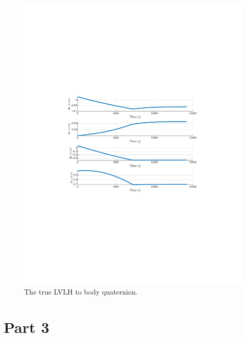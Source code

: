 \documentclass[]{article}
\begin{document}
\begin{figure}[!h]
	\centering
	\includegraphics[width=\linewidth,trim={4cm, 8cm, 4cm, 8cm},clip]{figs/P2Q4.pdf}
	\caption{The true LVLH to body quaternion.}
	\label{fig:P2Q4}
\end{figure}

\section{Part 3}
\end{document}
